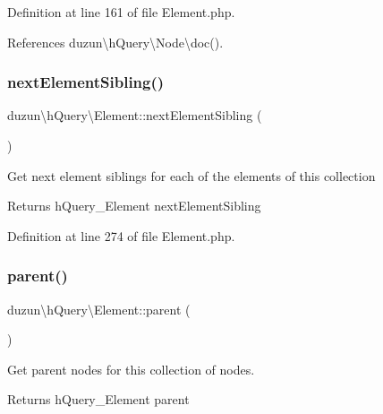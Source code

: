 Definition at line 161 of file Element.\+php.



References duzun\textbackslash{}h\+Query\textbackslash{}\+Node\textbackslash{}doc().

\mbox{\label{classduzun_1_1hQuery_1_1Element_aae1431b6dd85e2289ce1b86ba9c9b4c5}} 
\subsubsection{\texorpdfstring{next\+Element\+Sibling()}{nextElementSibling()}}
{\footnotesize\ttfamily duzun\textbackslash{}h\+Query\textbackslash{}\+Element\+::next\+Element\+Sibling (\begin{DoxyParamCaption}{ }\end{DoxyParamCaption})}

Get next element siblings for each of the elements of this collection

\begin{DoxyReturn}{Returns}
h\+Query\+\_\+\+Element next\+Element\+Sibling 
\end{DoxyReturn}


Definition at line 274 of file Element.\+php.

\mbox{\label{classduzun_1_1hQuery_1_1Element_a7a475b43ddf3e33b0d4fbc419d70369a}} 
\subsubsection{\texorpdfstring{parent()}{parent()}}
{\footnotesize\ttfamily duzun\textbackslash{}h\+Query\textbackslash{}\+Element\+::parent (\begin{DoxyParamCaption}{ }\end{DoxyParamCaption})}

Get parent nodes for this collection of nodes.

\begin{DoxyReturn}{Returns}
h\+Query\+\_\+\+Element parent 
\end{DoxyReturn}



